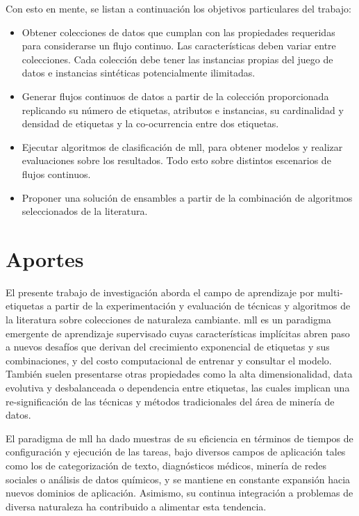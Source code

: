 Con esto en mente, se listan a continuación los objetivos particulares del
trabajo:
\begin{itemize}

   \item Obtener colecciones de datos que cumplan con las propiedades requeridas
      para considerarse un flujo continuo. Las características deben variar
      entre colecciones. Cada colección debe tener las instancias propias del
      juego de datos e instancias sintéticas potencialmente ilimitadas.


   \item Generar flujos continuos de datos a partir de la colección
      proporcionada replicando su número de etiquetas, atributos e instancias, su
      cardinalidad y densidad de etiquetas y la co-ocurrencia entre dos
      etiquetas.

   \item Ejecutar algoritmos de clasificación de \acrshort{mll}, para obtener
      modelos y realizar evaluaciones sobre los resultados. Todo esto sobre
      distintos escenarios de flujos continuos.

   \item Proponer una solución de ensambles a partir de la combinación de
      algoritmos seleccionados de la literatura.
      
\end{itemize}


\section{Aportes}

El presente  trabajo de investigación aborda el campo de aprendizaje por
multi-etiquetas a partir de la experimentación y evaluación de técnicas y
algoritmos de la literatura sobre colecciones de naturaleza cambiante.
\acrshort{mll} es un paradigma emergente de aprendizaje supervisado cuyas
características implícitas abren paso a nuevos desafíos que derivan del
crecimiento exponencial de etiquetas y sus combinaciones, y del costo
computacional de entrenar y consultar el modelo. También suelen presentarse
otras propiedades como la alta dimensionalidad, data evolutiva y desbalanceada o
dependencia entre etiquetas, las cuales implican una re-significación de las
técnicas y métodos tradicionales del área de minería de datos.

El paradigma de \acrshort{mll} ha dado muestras de su eficiencia en términos de
tiempos de configuración y ejecución de las tareas, bajo diversos campos de
aplicación tales como los de categorización de texto, diagnósticos médicos,
minería de redes sociales o análisis de datos químicos, y se mantiene en
constante expansión hacia nuevos dominios de aplicación. Asimismo, su continua
integración a problemas de diversa naturaleza ha contribuido a alimentar esta
tendencia.

